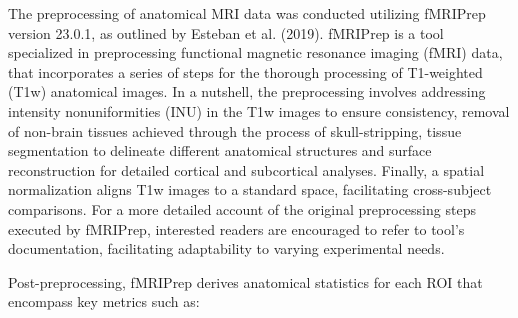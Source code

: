 \documentclass{cys}
\begin{document}
The preprocessing of anatomical MRI data was conducted utilizing fMRIPrep version 23.0.1, as outlined by Esteban et al. (2019). fMRIPrep is a tool specialized in preprocessing functional magnetic resonance imaging (fMRI) data, that incorporates a series of steps for the thorough processing of T1-weighted (T1w) anatomical images. In a nutshell, the preprocessing involves addressing intensity nonuniformities (INU) in the T1w images to ensure consistency, removal of non-brain tissues achieved through the process of skull-stripping, tissue segmentation to delineate different anatomical structures and surface reconstruction for detailed cortical and subcortical analyses. Finally, a spatial normalization aligns T1w images to a standard space, facilitating cross-subject comparisons. For a more detailed account of the original preprocessing steps executed by fMRIPrep, interested readers are encouraged to refer to tool's documentation, facilitating adaptability to varying experimental needs.

\bigskip
Post-preprocessing, fMRIPrep derives anatomical statistics for each ROI that encompass key metrics such as:
\end{document}
